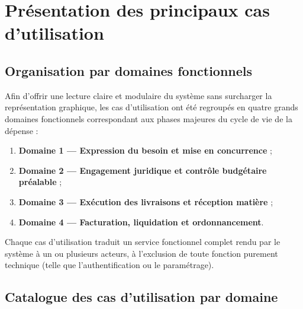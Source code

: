 \section{Présentation des principaux cas d'utilisation}

\subsection{Organisation par domaines fonctionnels}

Afin d'offrir une lecture claire et modulaire du système sans surcharger la représentation graphique, les cas d'utilisation ont été regroupés en quatre grands domaines fonctionnels correspondant aux phases majeures du cycle de vie de la dépense :

\begin{enumerate}
  \item \textbf{Domaine 1 — Expression du besoin et mise en concurrence} ;
  \item \textbf{Domaine 2 — Engagement juridique et contrôle budgétaire préalable} ;
  \item \textbf{Domaine 3 — Exécution des livraisons et réception matière} ;
  \item \textbf{Domaine 4 — Facturation, liquidation et ordonnancement}.
\end{enumerate}

Chaque cas d'utilisation traduit un service fonctionnel complet rendu par le système à un ou plusieurs acteurs, à l'exclusion de toute fonction purement technique (telle que l'authentification ou le paramétrage).

\subsection{Catalogue des cas d'utilisation par domaine}

